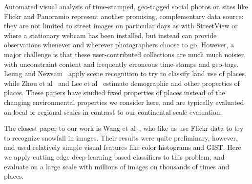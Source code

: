 Automated visual analysis of time-stamped, geo-tagged social photos on
sites like Flickr and Panoramio represent another promising,
complementary data source: they are not limited to street images on
particular days as with StreetView or where a stationary webcam has
been installed, but instead can provide observations whenever and
wherever photographers choose to go. However, a major challenge is that these
user-contributed collections are much much noisier, with unconstraint
content and frequently erroneous time-stamps and geo-tags.  Leung and
Newsam~\cite{Leung:2010wa} apply scene recognition to try to classify
land use of places, while Zhou et al~\cite{zhou2014recognizing} and Lee et
al~\cite{geoinformative2015wacv} estimate demographic and other
properties of places. These papers have studied fixed properties
of places instead of the changing environmental properties we consider here,
and are typically evaluated on local or regional scales in contrast to
our continental-scale evaluation.

The closest paper to our work is Wang et al~\cite{wang2013observing},
who like us use Flickr data to try to recognize snowfall in images.
Their results were quite preliminary, however, and used relatively
simple visual features like color histograms and GIST. Here we apply
cutting edge deep-learning based classifiers to this problem, and evaluate
on a large scale with millions of images on thousands of times and places.




